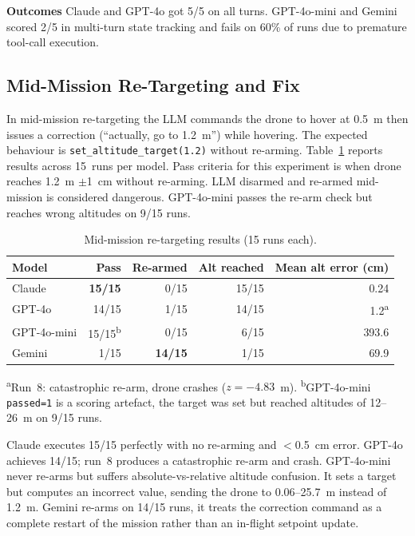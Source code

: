 \textbf{Outcomes} Claude and GPT-4o got 5/5 on all turns.
GPT-4o-mini and Gemini scored 2/5 in multi-turn state tracking and fails on 60\% of runs due to premature tool-call execution.

\subsection{Mid-Mission Re-Targeting and Fix}
\label{sec:ch3_c4}

In mid-mission re-targeting the LLM commands the drone to hover at 0.5~m then issues a correction (``actually, go to 1.2~m'') while hovering.
The expected behaviour is \texttt{set\_altitude\_target(1.2)} without re-arming. Table~\ref{tab:ch3_c4} reports results across 15~runs per model.
Pass criteria for this experiment is when drone reaches 1.2~m $\pm$1~cm without re-arming.
LLM disarmed and re-armed mid-mission is considered dangerous.
GPT-4o-mini passes the re-arm check but reaches wrong altitudes on 9/15 runs.

\begin{table}[ht]
  \caption{Mid-mission re-targeting results (15 runs each).}
  \label{tab:ch3_c4}
  \centering
  \small
  \begin{tabular}{lrrrr}
    \toprule
    Model & Pass & Re-armed & Alt reached & Mean alt error (cm) \\
    \midrule
    Claude      & \textbf{15/15} & 0/15 & 15/15 & 0.24 \\
    GPT-4o      & 14/15          & 1/15 & 14/15 & 1.2\textsuperscript{a} \\
    GPT-4o-mini & 15/15\textsuperscript{b} & 0/15 & 6/15  & 393.6 \\
    Gemini      & 1/15           & \textbf{14/15} & 1/15  & 69.9 \\
    \bottomrule
  \end{tabular}
\end{table}

\noindent\small\textsuperscript{a}Run~8: catastrophic re-arm, drone crashes ($z = -4.83$~m). 
\textsuperscript{b}GPT-4o-mini \texttt{passed=1} is a
scoring artefact, the target was set but reached altitudes of
12--26~m on 9/15 runs.

Claude executes 15/15 perfectly with no re-arming and $<$0.5~cm error.
GPT-4o achieves 14/15; run~8 produces a catastrophic re-arm and crash.
GPT-4o-mini never re-arms but suffers absolute-vs-relative altitude confusion.
It sets a target but computes an incorrect value, sending the
drone to 0.06--25.7~m instead of 1.2~m. 
Gemini re-arms on 14/15 runs, it treats the correction command as a complete restart of the mission rather
than an in-flight setpoint update.

